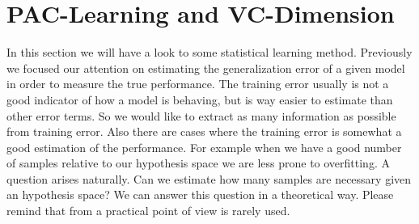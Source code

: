 \documentclass[main.tex]{subfiles}
\begin{document}
\section{PAC-Learning and VC-Dimension}
In this section we will have a look to some statistical learning method.
Previously we focused our attention on estimating the generalization error of a given model in order to measure the true performance. The training error usually is not a good indicator of how a model is behaving, but is way easier to estimate than other error terms. So we would like to extract as many information as possible from training error. Also there are cases where the training error is somewhat a good estimation of the performance. For example when we have a good number of samples relative to our hypothesis space we are less prone to overfitting. A question arises naturally. Can we estimate how many samples are necessary given an hypothesis space? We can answer this question in a theoretical way. Please remind that from a practical point of view is rarely used.
\end{document}
